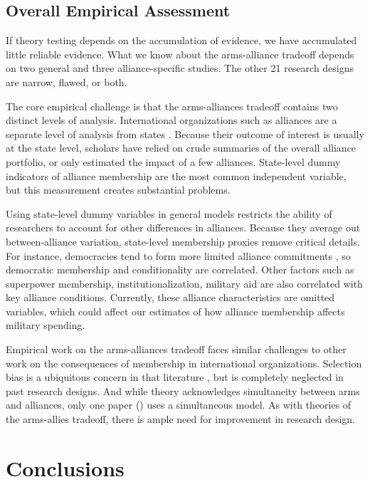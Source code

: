 \documentclass[12pt]{article}
\begin{document}
\subsection*{Overall Empirical Assessment}

If theory testing depends on the accumulation of evidence, we have accumulated little reliable evidence. What we know about the arms-alliance tradeoff depends on two general and three alliance-specific studies. The other 21 research designs are narrow, flawed, or both.  

The core empirical challenge is that the arms-alliances tradeoff contains two distinct levels of analysis. International organizations such as alliances are a separate level of analysis from states \citep{Mattes2012, Chibaetal2015}. Because their outcome of interest is usually at the state level, scholars have relied on crude summaries of the overall alliance portfolio, or only estimated the impact of a few alliances. State-level dummy indicators of alliance membership are the most common independent variable, but this measurement creates substantial problems. 

Using state-level dummy variables in general models restricts the ability of researchers to account for other differences in alliances. Because they average out between-alliance variation, state-level membership proxies remove critical details. For instance, democracies tend to form more limited alliance commitments \citep{Chibaetal2015}, so democratic membership and conditionality are correlated. Other factors such as superpower membership, institutionalization, military aid are also correlated with key alliance conditions. Currently, these alliance characteristics are omitted variables, which could affect our estimates of how alliance membership affects military spending. 

Empirical work on the arms-alliances tradeoff faces similar challenges to other work on the consequences of membership in international organizations. Selection bias is a ubiquitous concern in that literature \citep{Chaudoinetal2016}, but is completely neglected in past research designs. And while theory acknowledges simultaneity between arms and alliances, only one paper (\citet{DigiuseppePoast2016}) uses a simultaneous model. As with theories of the arms-allies tradeoff, there is ample need for improvement in research design.


\section*{Conclusions}
\end{document}
